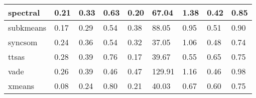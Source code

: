 \begin{table}[H]
\begin{tabular}{|l|l|l|l|l|l|l|l|l|}
\hline
spectral & 0.21 & 0.33 & 0.63 & 0.20 & 67.04 & 1.38 & 0.42 & 0.85 \\
\hline
subkmeans & 0.17 & 0.29 & 0.54 & 0.38 & 88.05 & 0.95 & 0.51 & 0.90 \\
\hline
syncsom & 0.24 & 0.36 & 0.54 & 0.32 & 37.05 & 1.06 & 0.48 & 0.74 \\
\hline
ttsas & 0.28 & 0.39 & 0.76 & 0.17 & 39.67 & 0.55 & 0.65 & 0.75 \\
\hline
vade & 0.26 & 0.39 & 0.46 & 0.47 & 129.91 & 1.16 & 0.46 & 0.98 \\
\hline
xmeans & 0.08 & 0.24 & 0.80 & 0.21 & 40.03 & 0.67 & 0.60 & 0.75 \\
\hline
\end{tabular}
\end{table}